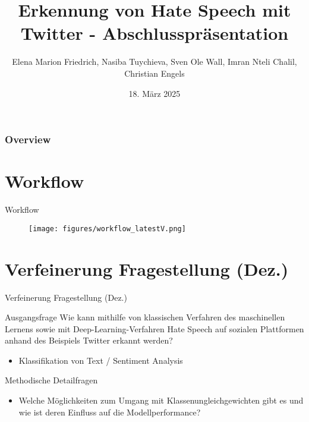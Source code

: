 \documentclass[aspectratio=169]{beamer} %
\title{Erkennung von Hate Speech mit Twitter - Abschlusspr\"asentation}
\author[Friedrich, Tuychieva, Wall, Chalil, Engels]{Elena Marion Friedrich, Nasiba Tuychieva, Sven Ole Wall, Imran Nteli Chalil, Christian Engels}
\institute{Artificial Intelligence Group,\\
University of Hagen, Germany}
\date{18. März 2025}
\begin{document}

\begin{frame}
  \titlepage
\end{frame}
\nologo

\begin{frame}
		\frametitle{Overview}
        \tableofcontents[]
\end{frame}



\section{Workflow}
\begin{frame}{Workflow}
 \begin{figure}[h!]
        \centering
        \texttt{[image: figures/workflow\_latestV.png]}
        \label{fig:yourimage}
    \end{figure}
\end{frame}



\section{Verfeinerung Fragestellung (Dez.)}
\begin{frame}{Verfeinerung Fragestellung (Dez.)}
    \begin{block}{Ausgangsfrage}
        Wie kann mithilfe von klassischen Verfahren des maschinellen Lernens sowie mit Deep-Learning-Verfahren Hate Speech auf sozialen Plattformen anhand des Beispiels Twitter erkannt werden?
        \begin{itemize}
            \item Klassifikation von Text / Sentiment Analysis
        \end{itemize}
    \end{block}    
    \begin{exampleblock}{Methodische Detailfragen}
        \begin{itemize}
            \item Welche M\"oglichkeiten zum Umgang mit Klassenungleichgewichten gibt es und wie ist deren Einfluss auf die Modellperformance?
        \end{itemize}
    \end{exampleblock}
\end{frame}
\end{document}
